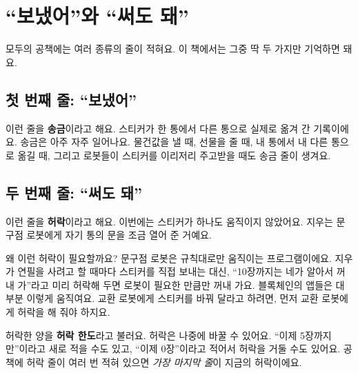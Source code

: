 \chapter{“보냈어”와 “써도 돼”}

모두의 공책에는 여러 종류의 줄이 적혀요.
이 책에서는 그중 딱 두 가지만 기억하면 돼요.

\section{첫 번째 줄: “보냈어”}

\begin{center}
\end{center}

이런 줄을 \textbf{송금}이라고 해요.
스티커가 한 통에서 다른 통으로 실제로 옮겨 간 기록이에요.
송금은 아주 자주 일어나요.
물건값을 낼 때, 선물을 줄 때, 내 통에서 내 다른 통으로 옮길 때,
그리고 로봇들이 스티커를 이리저리 주고받을 때도 송금 줄이 생겨요.

\section{두 번째 줄: “써도 돼”}

\begin{center}
\end{center}

이런 줄을 \textbf{허락}이라고 해요.
이번에는 스티커가 하나도 움직이지 않았어요.
지우는 문구점 로봇에게 자기 통의 문을 조금 열어 준 거예요.

왜 이런 허락이 필요할까요?
문구점 로봇은 규칙대로만 움직이는 프로그램이에요.
지우가 연필을 사려고 할 때마다 스티커를 직접 보내는 대신,
“10장까지는 네가 알아서 꺼내 가”라고 미리 허락해 두면 로봇이 필요한 만큼만 꺼내 가요.
블록체인의 앱들은 대부분 이렇게 움직여요.
교환 로봇에게 스티커를 바꿔 달라고 하려면, 먼저 교환 로봇에게 허락을 해 줘야 하지요.

허락한 양을 \textbf{허락 한도}라고 불러요.
허락은 나중에 바꿀 수 있어요.
“이제 5장까지만”이라고 새로 적을 수도 있고,
“이제 0장”이라고 적어서 허락을 거둘 수도 있어요.
공책에 허락 줄이 여러 번 적혀 있으면 \emph{가장 마지막 줄}이 지금의 허락이에요.

